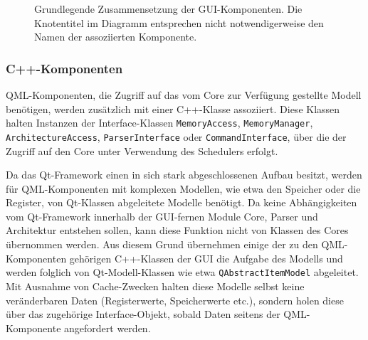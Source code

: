 \begin{figure}[H]
	\begin{center}
	\end{center}
	\caption{Grundlegende Zusammensetzung der GUI-Komponenten. Die Knotentitel im
	Diagramm entsprechen nicht notwendigerweise den Namen der assoziierten
	Komponente.}
	\label{fig:gui-composition}
\end{figure}

\subsubsection{C++-Komponenten}

QML-Komponenten, die Zugriff auf das vom Core zur Verfügung gestellte Modell
benötigen, werden zusätzlich mit einer C++-Klasse assoziiert. Diese Klassen
halten Instanzen der Interface-Klassen \texttt{MemoryAccess},
\texttt{MemoryManager}, \texttt{ArchitectureAccess}, \texttt{ParserInterface}
oder \texttt{CommandInterface}, über die der Zugriff auf den Core unter
Verwendung des Schedulers erfolgt.

Da das Qt-Framework einen in sich stark abgeschlossenen Aufbau besitzt, werden
für QML-Komponenten mit komplexen Modellen, wie etwa den Speicher oder die
Register, von Qt-Klassen abgeleitete Modelle benötigt. Da keine Abhängigkeiten
vom Qt-Framework innerhalb der GUI-fernen Module Core, Parser und Architektur
entstehen sollen, kann diese Funktion nicht von Klassen des Cores übernommen
werden. Aus diesem Grund übernehmen einige der zu den QML-Komponenten gehörigen
C++-Klassen der GUI die Aufgabe des Modells und werden folglich von
Qt-Modell-Klassen wie etwa \texttt{QAbstractItemModel} abgeleitet. Mit Ausnahme
von Cache-Zwecken halten diese Modelle selbst keine veränderbaren Daten
(Registerwerte, Speicherwerte etc.), sondern holen diese über das zugehörige
Interface-Objekt, sobald Daten seitens der QML-Komponente angefordert werden.

